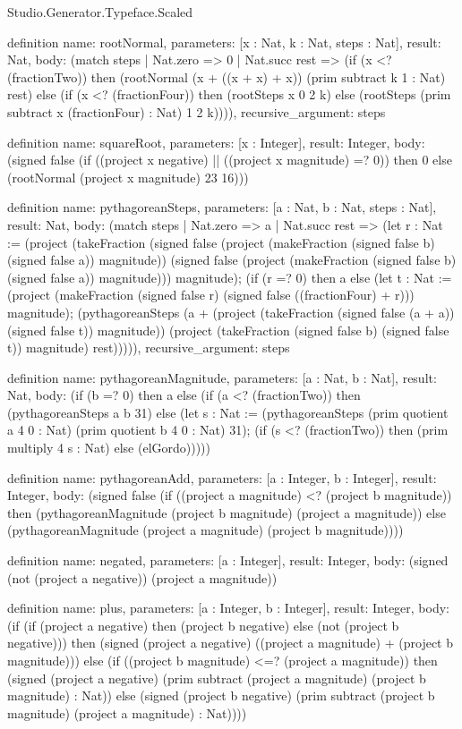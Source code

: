 \begin{lexlean}{Studio.Generator.Typeface.Scaled}
\begin{semanticmodule}
definition{
  name: rootNormal,
  parameters: [x : Nat, k : Nat, steps : Nat],
  result: Nat,
  body: (match steps
    | Nat.zero => 0
    | Nat.succ rest => (if (x <? (fractionTwo)) then (rootNormal (x + ((x + x) + x)) (prim subtract k 1 : Nat) rest) else (if (x <? (fractionFour)) then (rootSteps x 0 2 k) else (rootSteps (prim subtract x (fractionFour) : Nat) 1 2 k)))),
  recursive_argument: steps
}

definition{
  name: squareRoot,
  parameters: [x : Integer],
  result: Integer,
  body: (signed false (if ((project x negative) || ((project x magnitude) =? 0)) then 0 else (rootNormal (project x magnitude) 23 16)))
}

definition{
  name: pythagoreanSteps,
  parameters: [a : Nat, b : Nat, steps : Nat],
  result: Nat,
  body: (match steps
    | Nat.zero => a
    | Nat.succ rest => (let r : Nat := (project (takeFraction (signed false (project (makeFraction (signed false b) (signed false a)) magnitude)) (signed false (project (makeFraction (signed false b) (signed false a)) magnitude))) magnitude); (if (r =? 0) then a else (let t : Nat := (project (makeFraction (signed false r) (signed false ((fractionFour) + r))) magnitude); (pythagoreanSteps (a + (project (takeFraction (signed false (a + a)) (signed false t)) magnitude)) (project (takeFraction (signed false b) (signed false t)) magnitude) rest))))),
  recursive_argument: steps
}

definition{
  name: pythagoreanMagnitude,
  parameters: [a : Nat, b : Nat],
  result: Nat,
  body: (if (b =? 0) then a else (if (a <? (fractionTwo)) then (pythagoreanSteps a b 31) else (let s : Nat := (pythagoreanSteps (prim quotient a 4 0 : Nat) (prim quotient b 4 0 : Nat) 31); (if (s <? (fractionTwo)) then (prim multiply 4 s : Nat) else (elGordo)))))
}

definition{
  name: pythagoreanAdd,
  parameters: [a : Integer, b : Integer],
  result: Integer,
  body: (signed false (if ((project a magnitude) <? (project b magnitude)) then (pythagoreanMagnitude (project b magnitude) (project a magnitude)) else (pythagoreanMagnitude (project a magnitude) (project b magnitude))))
}

definition{
  name: negated,
  parameters: [a : Integer],
  result: Integer,
  body: (signed (not (project a negative)) (project a magnitude))
}

definition{
  name: plus,
  parameters: [a : Integer, b : Integer],
  result: Integer,
  body: (if (if (project a negative) then (project b negative) else (not (project b negative))) then (signed (project a negative) ((project a magnitude) + (project b magnitude))) else (if ((project b magnitude) <=? (project a magnitude)) then (signed (project a negative) (prim subtract (project a magnitude) (project b magnitude) : Nat)) else (signed (project b negative) (prim subtract (project b magnitude) (project a magnitude) : Nat))))
}


\end{semanticmodule}
\end{lexlean}
